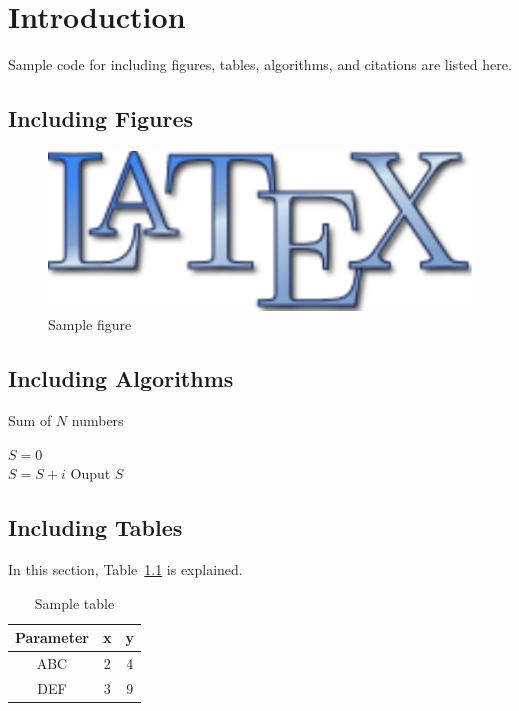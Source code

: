 \chapter{Introduction}\label{ch:introduction}

Sample code for including figures, tables, algorithms, and citations
are listed here.

\section{Including Figures}\label{sec:figures}
\begin{figure}[h]
  \centering
  \includegraphics[scale=0.15]{figures/latexlogo.pdf}
  \caption{Sample figure}
  \label{fig:latexlogo}
\end{figure}


\section{Including Algorithms}\label{sec:algorithms}
\begin{algorithm}[h]
  \caption{Sum of $N$ numbers}
  $S = 0$\\
  {
    $S = S + i$
  }
  Ouput $S$
\end{algorithm}


\section{Including Tables}\label{sec:tables}
In this section, Table~\ref{tab:sample1} is explained.
\begin{table}[h]
  \centering
  \caption{Sample table}
  \begin{tabular}{| c | c | c |}\hline
    \textbf{Parameter} & \textbf{x} & \textbf{y} \\\hline\hline
    ABC                & 2          & 4          \\\hline
    DEF                & 3          & 9          \\\hline	
  \end{tabular}
  \label{tab:sample1}
\end{table}

